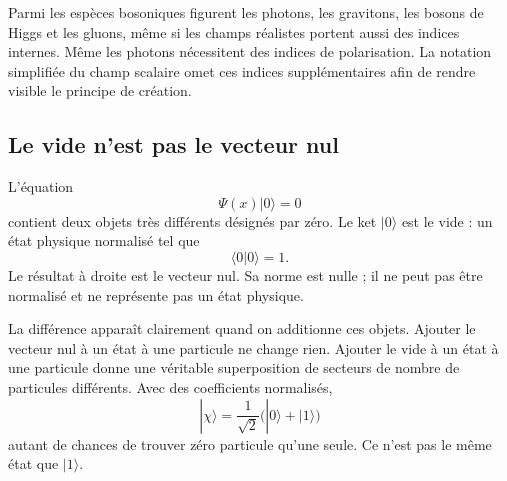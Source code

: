 Parmi les espèces bosoniques figurent les photons, les gravitons, les bosons de Higgs et les gluons, même si les champs réalistes portent aussi des indices internes. Même les photons nécessitent des indices de polarisation. La notation simplifiée du champ scalaire omet ces indices supplémentaires afin de rendre visible le principe de création.

\subsection{Le vide n’est pas le vecteur nul}

L’équation
\begin{equation}
\Psi(x)|0\rangle=0
\end{equation}
contient deux objets très différents désignés par zéro. Le ket \(|0\rangle\) est le vide : un état physique normalisé tel que
\begin{equation}
\langle0|0\rangle=1.
\end{equation}
Le résultat à droite est le vecteur nul. Sa norme est nulle ; il ne peut pas être normalisé et ne représente pas un état physique.

La différence apparaît clairement quand on additionne ces objets. Ajouter le vecteur nul à un état à une particule ne change rien. Ajouter le vide à un état à une particule donne une véritable superposition de secteurs de nombre de particules différents. Avec des coefficients normalisés,
\begin{equation}
|\chi\rangle=\frac{1}{\sqrt2}\bigl(|0\rangle+|1\rangle\bigr)
\end{equation}
autant de chances de trouver zéro particule qu’une seule. Ce n’est pas le même état que \(|1\rangle\).

\begin{classroomqa}
\end{classroomqa}

\begin{classroomqa}
\end{classroomqa}

